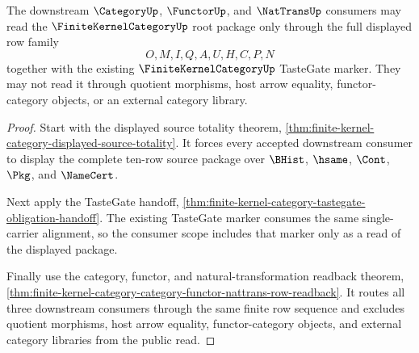 \begin{theorem}
\label{thm:finite-kernel-category-nattrans-consumer-scope}
The downstream $\CategoryUp$, $\FunctorUp$, and $\NatTransUp$ consumers may read
the $\FiniteKernelCategoryUp$ root package only through the full displayed row
family
$$
O,M,I,Q,A,U,H,C,P,N
$$
together with the existing $\FiniteKernelCategoryUp$ TasteGate marker. They may
not read it through quotient morphisms, host arrow equality, functor-category
objects, or an external category library.
\end{theorem}
\begin{proof}
Start with the displayed source totality theorem,
\autoref{thm:finite-kernel-category-displayed-source-totality}. It forces every
accepted downstream consumer to display the complete ten-row source package
over $\BHist$, $\hsame$, $\Cont$, $\Pkg$, and $\NameCert$.

Next apply the TasteGate handoff,
\autoref{thm:finite-kernel-category-tastegate-obligation-handoff}. The existing
TasteGate marker consumes the same single-carrier alignment, so the consumer
scope includes that marker only as a read of the displayed package.

Finally use the category, functor, and natural-transformation readback theorem,
\autoref{thm:finite-kernel-category-category-functor-nattrans-row-readback}.
It routes all three downstream consumers through the same finite row sequence
and excludes quotient morphisms, host arrow equality, functor-category objects,
and external category libraries from the public read.
\end{proof}
